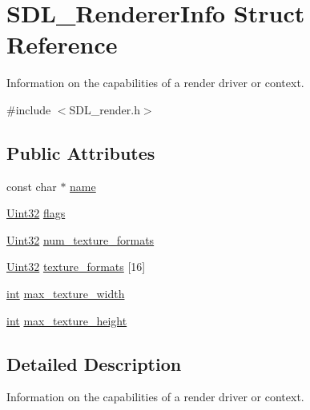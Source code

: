 \hypertarget{struct_s_d_l___renderer_info}{\section{S\-D\-L\-\_\-\-Renderer\-Info Struct Reference}
\label{struct_s_d_l___renderer_info}
}


Information on the capabilities of a render driver or context.  




{\ttfamily \#include $<$S\-D\-L\-\_\-render.\-h$>$}

\subsection*{Public Attributes}
\begin{DoxyCompactItemize}
\item 
const char $\ast$ \hyperlink{struct_s_d_l___renderer_info_a433ecb2865c81ba9f28038e56a4ae6f3}{name}
\item 
\hyperlink{_s_d_l__stdinc_8h_add440eff171ea5f55cb00c4a9ab8672d}{Uint32} \hyperlink{struct_s_d_l___renderer_info_a95cf0ffd1704fd0a4dd8ceac6c9f0542}{flags}
\item 
\hyperlink{_s_d_l__stdinc_8h_add440eff171ea5f55cb00c4a9ab8672d}{Uint32} \hyperlink{struct_s_d_l___renderer_info_acdec165b2053b914313f5996983ec6b8}{num\-\_\-texture\-\_\-formats}
\item 
\hyperlink{_s_d_l__stdinc_8h_add440eff171ea5f55cb00c4a9ab8672d}{Uint32} \hyperlink{struct_s_d_l___renderer_info_a88450f9d48e593ec4571e3ba7cc3427d}{texture\-\_\-formats} \mbox{[}16\mbox{]}
\item 
\hyperlink{_s_d_l__thread_8h_a6a64f9be4433e4de6e2f2f548cf3c08e}{int} \hyperlink{struct_s_d_l___renderer_info_a6e6757e3d5c1f0922adaba39380edfa6}{max\-\_\-texture\-\_\-width}
\item 
\hyperlink{_s_d_l__thread_8h_a6a64f9be4433e4de6e2f2f548cf3c08e}{int} \hyperlink{struct_s_d_l___renderer_info_a87c6a13e8d535c2148f8913c05e13102}{max\-\_\-texture\-\_\-height}
\end{DoxyCompactItemize}


\subsection{Detailed Description}
Information on the capabilities of a render driver or context. 

